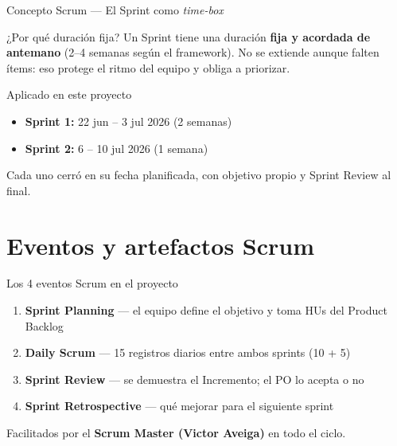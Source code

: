 \documentclass[11pt,aspectratio=169]{beamer}
\begin{document}
\begin{frame}{Concepto Scrum --- El Sprint como \emph{time-box}}
  \begin{block}{¿Por qué duración fija?}
    Un Sprint tiene una duración \textbf{fija y acordada de antemano} (2--4 semanas según el
    framework). No se extiende aunque falten ítems: eso protege el ritmo del equipo y obliga a
    priorizar.
  \end{block}
  \begin{exampleblock}{Aplicado en este proyecto}
    \begin{itemize}
      \item \textbf{Sprint 1:} 22 jun -- 3 jul 2026 (2 semanas)
      \item \textbf{Sprint 2:} 6 -- 10 jul 2026 (1 semana)
    \end{itemize}
    Cada uno cerró en su fecha planificada, con objetivo propio y Sprint Review al final.
  \end{exampleblock}
\end{frame}

\section{Eventos y artefactos Scrum}

\begin{frame}{Los 4 eventos Scrum en el proyecto}
  \begin{enumerate}
    \item \textbf{Sprint Planning} --- el equipo define el objetivo y toma HUs del Product Backlog
    \item \textbf{Daily Scrum} --- 15 registros diarios entre ambos sprints (10 + 5)
    \item \textbf{Sprint Review} --- se demuestra el Incremento; el PO lo acepta o no
    \item \textbf{Sprint Retrospective} --- qué mejorar para el siguiente sprint
  \end{enumerate}
  \vspace{0.3cm}
  \centering\small Facilitados por el \textbf{Scrum Master (Victor Aveiga)} en todo el ciclo.
\end{frame}
\end{document}
